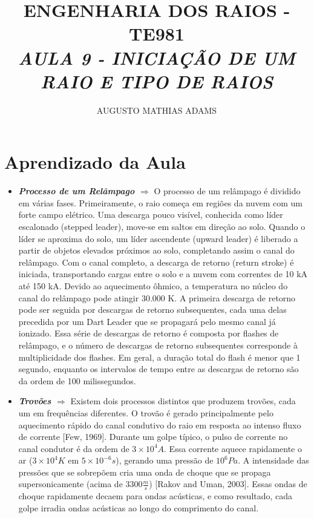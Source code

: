 \documentclass[a4paper, 12pt, onecolumn,singlespacing]{article}
\title{\normalsize{ENGENHARIA DOS RAIOS - TE981}\\ \huge{\textbf\textit{{AULA 9 - INICIAÇÃO DE UM RAIO E TIPO DE RAIOS}}\\}}
\author{\small{AUGUSTO MATHIAS ADAMS}}
\begin{document}
	
	\maketitle
	
	\section{Aprendizado da Aula}
	
	\begin{itemize}
		\item \textbf{\textit{Processo de um Relâmpago $\Rightarrow$ }} O processo de um relâmpago é dividido em várias fases. Primeiramente, o raio começa em regiões da nuvem com um forte campo elétrico. Uma descarga pouco visível, conhecida como líder escalonado (stepped leader), move-se em saltos em direção ao solo. Quando o líder se aproxima do solo, um líder ascendente (upward leader) é liberado a partir de objetos elevados próximos ao solo, completando assim o canal do relâmpago. Com o canal completo, a descarga de retorno (return stroke) é iniciada, transportando cargas entre o solo e a nuvem com correntes de 10 kA até 150 kA. Devido ao aquecimento ôhmico, a temperatura no núcleo do canal do relâmpago pode atingir 30.000 K. A primeira descarga de retorno pode ser seguida por descargas de retorno subsequentes, cada uma delas precedida por um Dart Leader que se propagará pelo mesmo canal já ionizado. Essa série de descargas de retorno é composta por flashes de relâmpago, e o número de descargas de retorno subsequentes corresponde à multiplicidade dos flashes. Em geral, a duração total do flash é menor que 1 segundo, enquanto os intervalos de tempo entre as descargas de retorno são da ordem de 100 milissegundos.
		
		\item \textbf{\textit{Trovões $\Rightarrow$ }}Existem dois processos distintos que produzem trovões, cada um em frequências diferentes. O trovão é gerado principalmente pelo aquecimento rápido do canal condutivo do raio em resposta ao intenso fluxo de corrente [Few, 1969]. Durante um golpe típico, o pulso de corrente no canal condutor é da ordem de $3 \times 10^4 A$. Essa corrente aquece rapidamente o ar ($3 \times 10^4K$ em $5 \times 10^{-6} s$), gerando uma pressão de $10^6Pa$. A intensidade das pressões que se sobrepõem cria uma onda de choque que se propaga supersonicamente (acima de $3300 \frac{m}{s}$) [Rakov and Uman, 2003]. Essas ondas de choque rapidamente decaem para ondas acústicas, e como resultado, cada golpe irradia ondas acústicas ao longo do comprimento do canal.
		

\end{itemize}
\end{document}
